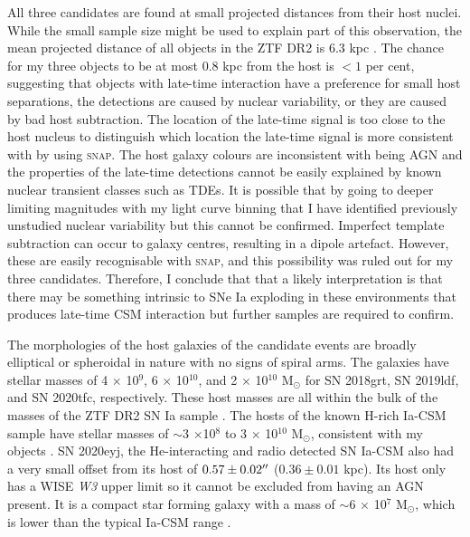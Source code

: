 \documentclass[a4paper,oneside,12pt, class=Latex/Classes/PhDthesisPSnPDF, crop=false]{standalone}
\begin{document}
All three candidates are found at small projected distances from their host nuclei. While the small sample size might be used to explain part of this observation, the mean projected distance of all objects in the ZTF DR2 is 6.3 kpc \citep{DR2_Overview}. The chance for my three objects to be at most 0.8 kpc from the host is $<1$ per cent, suggesting that objects with late-time interaction have a preference for small host separations, the detections are caused by nuclear variability, or they are caused by bad host subtraction. The location of the late-time signal is too close to the host nucleus to distinguish which location the late-time signal is more consistent with by using \textsc{snap}. The host galaxy colours are inconsistent with being AGN and the properties of the late-time detections cannot be easily explained by known nuclear transient classes such as TDEs. It is possible that by going to deeper limiting magnitudes with my light curve binning that I have identified previously unstudied nuclear variability but this cannot be confirmed. Imperfect template subtraction can occur to galaxy centres, resulting in a dipole artefact. However, these are easily recognisable with \textsc{snap}, and this possibility was ruled out for my three candidates. Therefore, I conclude that that a likely interpretation is that there may be something intrinsic to SNe Ia exploding in these environments that produces late-time CSM interaction but further samples are required to confirm.

The morphologies of the host galaxies of the candidate events are broadly elliptical or spheroidal in nature with no signs of spiral arms. The galaxies have stellar masses of 4 $\times$ 10$^9$, 6 $\times$ 10$^10$, and 2 $\times$ 10$^{10}$ M$_\odot$ for SN 2018grt, SN 2019ldf, and SN 2020tfc, respectively. These host masses are all within the bulk of the masses of the ZTF DR2 SN Ia sample \citep{DR2_Overview}. The hosts of the known H-rich Ia-CSM sample have stellar masses of $\sim$3 $\times$10$^8$ to 3 $\times$ 10$^{10}$ M$_\odot$, consistent with my objects \citep{Ia-CSM_BTS}. SN 2020eyj, the He-interacting and radio detected SN Ia-CSM \citep{Kool_He_CSM} also had a very small offset from its host of $0.57\pm0.02^{\prime\prime}$ ($0.36\pm0.01$ kpc). Its host only has a WISE \textit{W3} upper limit so it cannot be excluded from having an AGN present. It is a compact star forming galaxy with a mass of $\sim$6 $\times$ 10$^7$ M$_\odot$, which is lower than the typical Ia-CSM range \citep{Ia-CSM_BTS}. 
\end{document}
